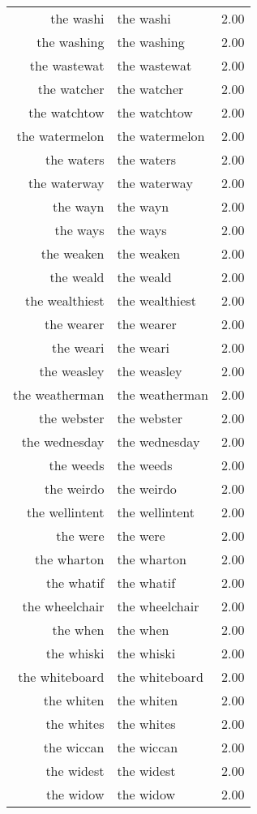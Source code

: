 \begin{table}[ht]
\begin{tabular}{rlr}
  the washi & the washi & 2.00 \\ 
  the washing & the washing & 2.00 \\ 
  the wastewat & the wastewat & 2.00 \\ 
  the watcher & the watcher & 2.00 \\ 
  the watchtow & the watchtow & 2.00 \\ 
  the watermelon & the watermelon & 2.00 \\ 
  the waters & the waters & 2.00 \\ 
  the waterway & the waterway & 2.00 \\ 
  the wayn & the wayn & 2.00 \\ 
  the ways & the ways & 2.00 \\ 
  the weaken & the weaken & 2.00 \\ 
  the weald & the weald & 2.00 \\ 
  the wealthiest & the wealthiest & 2.00 \\ 
  the wearer & the wearer & 2.00 \\ 
  the weari & the weari & 2.00 \\ 
  the weasley & the weasley & 2.00 \\ 
  the weatherman & the weatherman & 2.00 \\ 
  the webster & the webster & 2.00 \\ 
  the wednesday & the wednesday & 2.00 \\ 
  the weeds & the weeds & 2.00 \\ 
  the weirdo & the weirdo & 2.00 \\ 
  the wellintent & the wellintent & 2.00 \\ 
  the were & the were & 2.00 \\ 
  the wharton & the wharton & 2.00 \\ 
  the whatif & the whatif & 2.00 \\ 
  the wheelchair & the wheelchair & 2.00 \\ 
  the when & the when & 2.00 \\ 
  the whiski & the whiski & 2.00 \\ 
  the whiteboard & the whiteboard & 2.00 \\ 
  the whiten & the whiten & 2.00 \\ 
  the whites & the whites & 2.00 \\ 
  the wiccan & the wiccan & 2.00 \\ 
  the widest & the widest & 2.00 \\ 
  the widow & the widow & 2.00 \\ 

\end{tabular}
\end{table}
